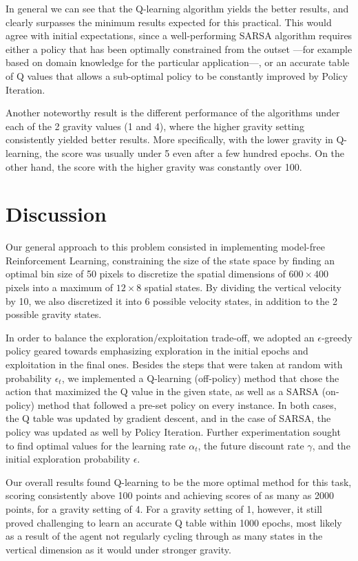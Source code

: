 \documentclass[11pt]{article}
\begin{document}
In general we can see that the Q-learning algorithm yields the better results, and clearly surpasses the minimum results expected for this practical. This would agree with initial expectations, since a well-performing SARSA algorithm requires either a policy that has been optimally constrained from the outset ---for example based on domain knowledge for the particular application---, or an accurate table of Q values that allows a sub-optimal policy to be constantly improved by Policy Iteration.

Another noteworthy result is the different performance of the algorithms under each of the 2 gravity values (1 and 4), where the higher gravity setting consistently yielded better results. More specifically, with the lower gravity in Q-learning, the score was usually under 5 even after a few hundred epochs. On the other hand, the score with the higher gravity was constantly over 100. 

\section{Discussion} 

Our general approach to this problem consisted in implementing model-free Reinforcement Learning, constraining the size of the state space by finding an optimal bin size of 50 pixels to discretize the spatial dimensions of $600 \times 400$ pixels into a maximum of $12 \times 8$ spatial states. By dividing the vertical velocity by 10, we also discretized it into 6 possible velocity states, in addition to the 2 possible gravity states.

In order to balance the exploration/exploitation trade-off, we adopted an $\epsilon$-greedy policy geared towards emphasizing exploration in the initial epochs and exploitation in the final ones. Besides the steps that were taken at random with probability $\epsilon_t$, we implemented a Q-learning (off-policy) method that chose the action that maximized the Q value in the given state, as well as a SARSA (on-policy) method that followed a pre-set policy on every instance. In both cases, the Q table was updated by gradient descent, and in the case of SARSA, the policy was updated as well by Policy Iteration. Further experimentation sought to find optimal values for the learning rate $\alpha_t$, the future discount rate $\gamma$, and the initial exploration probability $\epsilon$.

Our overall results found Q-learning to be the more optimal method for this task, scoring consistently above 100 points and achieving scores of as many as 2000 points, for a gravity setting of 4. For a gravity setting of 1, however, it still proved challenging to learn an accurate Q table within 1000 epochs, most likely as a result of the agent not regularly cycling through as many states in the vertical dimension as it would under stronger gravity.
\end{document}
